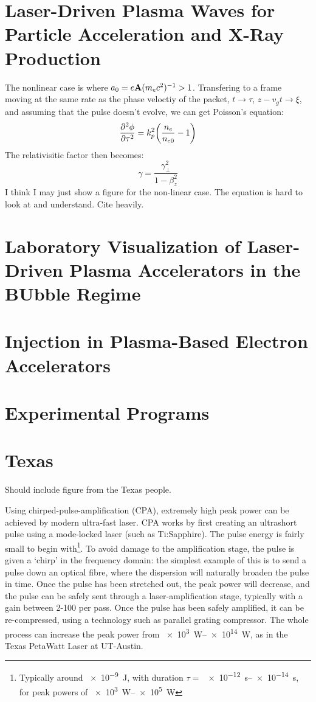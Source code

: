 \documentclass[12pt, titlepage]{article}
\begin{document}
\section{Laser-Driven Plasma Waves for Particle Acceleration and X-Ray Production}
The nonlinear case is where $a_0 = e\vb{A}(m_e c^2)^{-1} > 1$. Transfering to
a frame moving at the same rate as the phase veloctiy of the packet,  $t\rightarrow \tau$, $z-v_g t \rightarrow \xi $, and assuming that the pulse 
doesn't evolve, we can get Poisson's equation:
\begin{equation}
    \pdv[2]{\phi}{\tau} = k_p^2 \qty( \frac{n_e}{n_{e0}} - 1)
\end{equation}
The relativisitic factor then becomes:
\begin{equation}
    \gamma = \frac{\gamma_\bot^2}{1-\beta_z^2} 
\end{equation}
I think I may just show a figure for the non-linear case. The equation is hard 
to look at and understand. Cite heavily.


\section{Laboratory Visualization of Laser-Driven Plasma Accelerators in the BUbble Regime}
\section{Injection in Plasma-Based Electron Accelerators}
\section{Experimental Programs}
\section{Texas}
Should include figure from the Texas people. 

Using chirped-pulse-amplification (CPA), extremely high peak power can be achieved by modern ultra-fast laser. CPA works by first creating an ultrashort
pulse using a mode-locked laser (such as Ti:Sapphire). The pulse energy is fairly small to begin with\footnote{Typically around \SI{e-9}{\joule}, with duration $\tau =$ \SIrange{e-12}{e-14}{\second}, for peak powers of \SIrange{e3}{e5}{\watt} }. To avoid damage to the amplification stage, the pulse is given a `chirp' in the frequency domain: the simplest example of this is to send a pulse down an optical fibre, where the dispersion will naturally broaden the pulse
in time. Once the pulse has been stretched out, the peak power will decrease, and the pulse can be safely sent through a laser-amplification stage, typically with a gain between 2-100 per pass. Once the pulse has been safely amplified, it can be re-compressed, using a technology such as parallel grating compressor.
The whole process can increase the peak power from \SIrange{e3}{e14}{\watt}, as
in the Texas PetaWatt Laser at UT-Austin.
\end{document}
